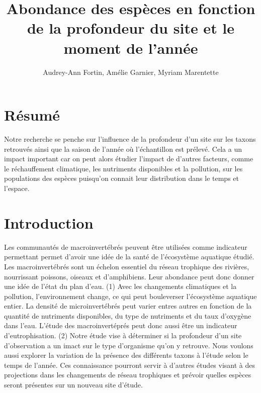 \documentclass[9pt,twocolumn,twoside,]{pnas-new}
\title{Abondance des espèces en fonction de la profondeur du site et le
moment de l'année}
\author[a,1,2]{Audrey-Ann Fortin, Amélie Garnier, Myriam Marentette}
\affil[a]{Université de Sherbrooke}
\begin{document}
\verticaladjustment{-2pt}



\maketitle
\thispagestyle{firststyle}


\acknow{}

\hypertarget{ruxe9sumuxe9}{%
\section*{Résumé}\label{ruxe9sumuxe9}}

Notre recherche se penche sur l'influence de la profondeur d'un site sur
les taxons retrouvés ainsi que la saison de l'année où l'échantillon est
prélevé. Cela a un impact important car on peut alors étudier l'impact
de d'autres facteurs, comme le réchauffement climatique, les nutriments
disponibles et la pollution, sur les populations des espèces puisqu'on
connait leur distribution dans le temps et l'espace.

\hypertarget{introduction}{%
\section*{Introduction}\label{introduction}}

Les communautés de macroinvertébrés peuvent être utilisées comme
indicateur permettant permet d'avoir une idée de la santé de
l'écosystème aquatique étudié. Les macroinvertébrés sont un échelon
essentiel du réseau trophique des rivières, nourrissant poissons,
oiseaux et d'amphibiens. Leur abondance peut donc donner une idée de
l'état du plan d'eau. (1) Avec les changements climatiques et la
pollution, l'environnement change, ce qui peut bouleverser l'écosystème
aquatique entier. La densité de microinvertébrés peut varier entres
autres en fonction de la quantité de nutriments disponibles, du type de
nutriments et du taux d'oxygène dans l'eau. L'étude des macroinvertéprés
peut donc aussi être un indicateur d'eutrophisation. (2) Notre étude
vise à déterminer si la profondeur d'un site d'observation a un imact
sur le type d'organisme qu'on y retrouve. Nous voulons aussi explorer la
variation de la présence des différents taxons à l'étude selon le temps
de l'année. Ces connaissance pourront servir à d'autres études visant à
des projections dans les changements de réseau trophiques et prévoir
quelles espèces seront présentes sur un nouveau site d'étude.
\end{document}
